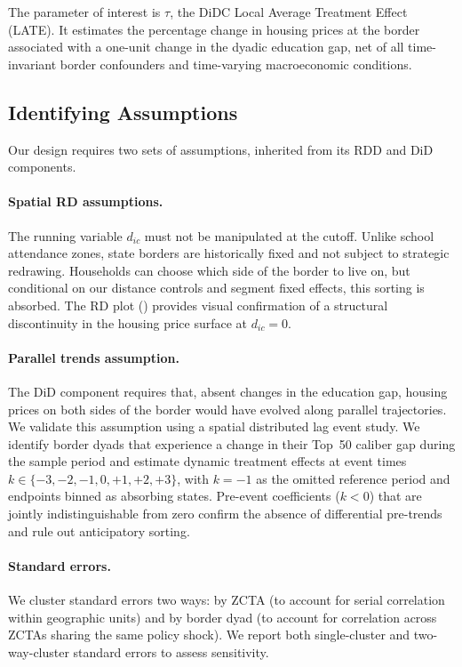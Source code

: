 \documentclass[12pt]{article}
\begin{document}
The parameter of interest is $\tau$, the DiDC Local Average Treatment Effect (LATE). It estimates the percentage change in housing prices at the border associated with a one-unit change in the dyadic education gap, net of all time-invariant border confounders and time-varying macroeconomic conditions.

\subsection{Identifying Assumptions}

Our design requires two sets of assumptions, inherited from its RDD and DiD components.

\paragraph{Spatial RD assumptions.} The running variable $d_{ic}$ must not be manipulated at the cutoff. Unlike school attendance zones, state borders are historically fixed and not subject to strategic redrawing. Households can choose which side of the border to live on, but conditional on our distance controls and segment fixed effects, this sorting is absorbed. The RD plot () provides visual confirmation of a structural discontinuity in the housing price surface at $d_{ic} = 0$.

\paragraph{Parallel trends assumption.} The DiD component requires that, absent changes in the education gap, housing prices on both sides of the border would have evolved along parallel trajectories. We validate this assumption using a spatial distributed lag event study. We identify border dyads that experience a change in their Top~50 caliber gap during the sample period and estimate dynamic treatment effects at event times $k \in \{-3, -2, -1, 0, +1, +2, +3\}$, with $k = -1$ as the omitted reference period and endpoints binned as absorbing states. Pre-event coefficients ($k < 0$) that are jointly indistinguishable from zero confirm the absence of differential pre-trends and rule out anticipatory sorting.

\paragraph{Standard errors.} We cluster standard errors two ways: by ZCTA (to account for serial correlation within geographic units) and by border dyad (to account for correlation across ZCTAs sharing the same policy shock). We report both single-cluster and two-way-cluster standard errors to assess sensitivity.
\end{document}
